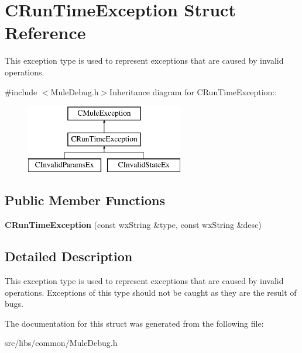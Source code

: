 \section{CRunTimeException Struct Reference}
\label{structCRunTimeException}


This exception type is used to represent exceptions that are caused by invalid operations.  


{\ttfamily \#include $<$MuleDebug.h$>$}Inheritance diagram for CRunTimeException::\begin{figure}[H]
\begin{center}
\leavevmode
\includegraphics[height=3cm]{structCRunTimeException}
\end{center}
\end{figure}
\subsection*{Public Member Functions}
\begin{DoxyCompactItemize}
\item 
{\bfseries CRunTimeException} (const wxString \&type, const wxString \&desc)\label{structCRunTimeException_ab13929b2d6e3118c6b54e0efc88ce18e}

\end{DoxyCompactItemize}


\subsection{Detailed Description}
This exception type is used to represent exceptions that are caused by invalid operations. Exceptions of this type should not be caught as they are the result of bugs. 

The documentation for this struct was generated from the following file:\begin{DoxyCompactItemize}
\item 
src/libs/common/MuleDebug.h\end{DoxyCompactItemize}
